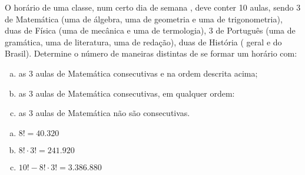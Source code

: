 \begin{ex}
 	O horário de uma classe, num certo dia de semana , deve conter 10 aulas, sendo 3 de Matemática (uma de álgebra, uma de geometria e uma de trigonometria), duas de Física (uma de mecânica e uma de termologia), 3 de Português (uma de gramática, uma de literatura, uma de redação), duas de História ( geral e do Brasil). Determine o número de maneiras distintas de se formar um horário com:
    \begin{enumerate}[(a)]
    \item as 3 aulas de Matemática consecutivas e na ordem descrita acima;
    \item as 3 aulas de Matemática consecutivas, em qualquer ordem: 
    \item as 3 aulas de Matemática não são consecutivas.
    \end{enumerate}
      \begin{sol}
        \phantom{A} 
          \begin{enumerate} [(a)]
              \item $8!=40.320$
              \item $8!\cdot3!=241.920$
              \item $10! - 8!\cdot3!=3.386.880$
          \end{enumerate}
      \end{sol}
\end{ex}